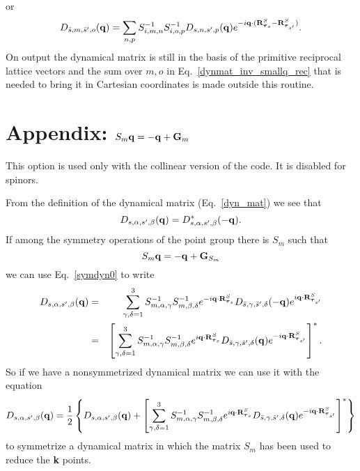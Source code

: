 \documentclass[12pt,a4paper,twoside]{report}
\begin{document}
or
\begin{equation}
D_{\bar s,m,\bar s',o}({\bf q}) =
\sum_{n,p}  S^{-1}_{i,m,n}    S^{-1}_{i,o,p} 
D_{s,n,s',p}({\bf q})
e^{-i {\bf q} \cdot ({\bf R}^{S}_{\boldsymbol{\tau}_s} - {\bf R}^{S}_{\boldsymbol{\tau}_{s'}})}.
\end{equation}
On output the dynamical matrix is still in the basis of the primitive reciprocal lattice vectors and the sum over $m,o$ in Eq.~\ref{dynmat_inv_smallq_rec} that is needed to bring it in Cartesian coordinates is made outside this routine.

\section{Appendix: $S_{m} {\bf q} = -{\bf q} + {\bf G}_m$ }

This option is used only with the collinear version of the code. It is disabled for spinors.

From the definition of the dynamical matrix
(Eq.~\ref{dyn_mat}) we see that
\begin{equation}
D_{s,\alpha,s',\beta}({\bf q}) =
D^*_{s,\alpha,s',\beta}(-{\bf q}).
\end{equation}
If among the symmetry operations of the point group there is $S_m$ such that
\begin{equation}
S_{m} {\bf q} = -{\bf q} + {\bf G}_{S_m}
\label{sminusq}
\end{equation}
we can use Eq.~\ref{symdyn0} to write
\begin{eqnarray}
D_{s,\alpha,s',\beta}({\bf q}) &=&
\sum_{\gamma,\delta=1}^3  S^{-1}_{m,\alpha,\gamma} S^{-1}_{m,\beta,\delta}
e^{-i {\bf q} \cdot {\bf R}^{S}_{\boldsymbol{\tau}_s} }
D_{\bar s,\gamma,\bar s',\delta}(-{\bf q})
e^{i {\bf q} \cdot {\bf R}^{S}_{\boldsymbol{\tau}_{s'}}} \nonumber \\
&=&
\left[ \sum_{\gamma,\delta=1}^3  S^{-1}_{m,\alpha,\gamma} S^{-1}_{m,\beta,\delta}
e^{i {\bf q} \cdot {\bf R}^{S}_{\boldsymbol{\tau}_s} }
D_{\bar s,\gamma,\bar s',\delta}({\bf q})
e^{-i {\bf q} \cdot {\bf R}^{S}_{\boldsymbol{\tau}_{s'}}} 
\right]^*.
\label{symdyn0_mq}
\end{eqnarray}
So if we have a nonsymmetrized dynamical matrix we can use it with the equation
\begin{equation}
D_{s,\alpha,s',\beta}({\bf q})=
{1\over 2}
\left\{D_{s,\alpha,s',\beta}({\bf q}) +
\left[\sum_{\gamma,\delta=1}^3  S^{-1}_{m,\alpha,\gamma} S^{-1}_{m,\beta,\delta}
e^{i {\bf q} \cdot {\bf R}^{S}_{\boldsymbol{\tau}_s} }
D_{\bar s,\gamma,\bar s',\delta}({\bf q})
e^{-i {\bf q} \cdot {\bf R}^{S}_{\boldsymbol{\tau}_{s'}}} 
\right]^* \right\}
\end{equation}
to symmetrize a dynamical matrix in which the
matrix $S_m$ has been used to reduce the {\bf k} points.
\end{document}
